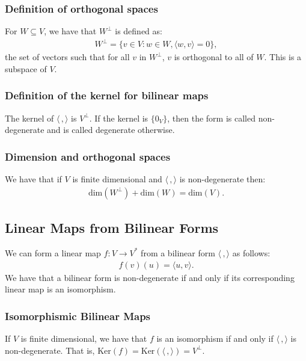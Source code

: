 \subsubsection{Definition of orthogonal spaces}

For $W \subseteq V$, we have that $W^\perp$ is defined as: \begin{gather*}
  W^\perp = \{v \in V : w \in W, \langle w, v \rangle = 0\},
\end{gather*} the set of vectors such that for all $v$ in $W^\perp$, $v$ is orthogonal
to all of $W$. This is a subspace of $V$.

\subsubsection{Definition of the kernel for bilinear maps}

The kernel of $\langle \, , \rangle$ is $V^\perp$. If the kernel is $\{0_V\}$,
then the form is called non-degenerate and is called degenerate otherwise.

\subsubsection{Dimension and orthogonal spaces}

We have that if $V$ is finite dimensional and $\langle \, , \rangle$ is non-degenerate
then: \begin{gather*}
  \text{dim}(W^\perp) + \text{dim}(W) = \text{dim}(V).
\end{gather*}

\subsection{Linear Maps from Bilinear Forms}

We can form a linear map $f : V \to V^*$ from a bilinear form $\langle \, , \rangle$ 
as follows: \begin{gather*}
  f(v)(u) = \langle u, v \rangle.
\end{gather*} We have that a bilinear form is non-degenerate if and only if its corresponding
linear map is an isomorphism.

\subsubsection{Isomorphismic Bilinear Maps}

If $V$ is finite dimensional, we have that $f$ is an isomorphism if and only if 
$\langle \, , \rangle$ is non-degenerate. That is, $\text{Ker}(f) 
= \text{Ker}(\langle \, , \rangle) = V^\perp$.

